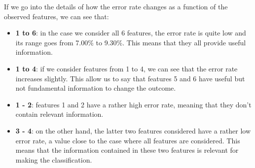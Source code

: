 If we go into the details of how the error rate changes as a function of the observed features,
we can see that:
\begin{itemize}
    \item \textbf{1 to 6}: in the case we consider all 6 features, the error rate is quite low and its range
    goes from 7.00\% to 9.30\%. This means that they all provide useful information.
    \item \textbf{1 to 4}: if we consider features from 1 to 4, we can see that the error rate increases slightly.
    This allow us to say that features 5 and 6 have useful but not fundamental information to change the outcome.
    \item \textbf{1 - 2}: features 1 and 2 have a rather high error rate, meaning that they don't contain
    relevant information.
    \item \textbf{3 - 4}: on the other hand, the latter two features considered have a rather low error rate, a value
    close to the case where all features are considered. This means that the information contained in these two
    features is relevant for making the classification.
\end{itemize}


